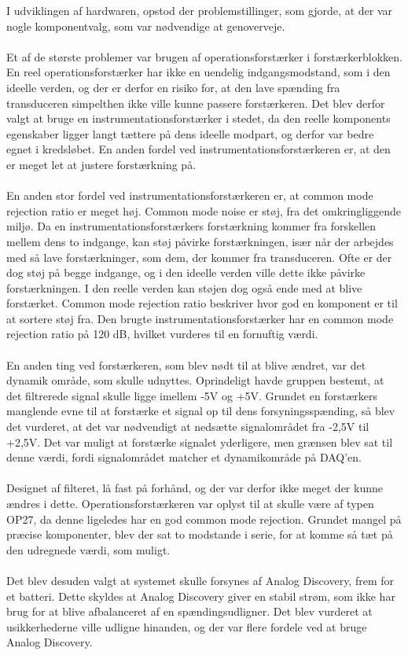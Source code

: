 I udviklingen af hardwaren, opstod der problemstillinger, som  gjorde, at der var nogle komponentvalg, som var nødvendige at genoverveje.\\
\\
Et af de største problemer var brugen af  operationsforstærker i forstærkerblokken. En reel operationsforstærker har ikke en uendelig indgangsmodstand, som i den ideelle verden, og der er derfor en risiko for, at den lave spænding fra transduceren simpelthen ikke ville kunne passere forstærkeren. Det blev derfor valgt at bruge en instrumentationsforstærker i stedet, da den reelle komponents egenskaber ligger langt tættere på dens ideelle modpart, og derfor var bedre egnet i kredsløbet. En anden fordel ved instrumentationsforstærkeren er, at den er meget let at justere forstærkning på.\\
\\
En anden stor fordel ved instrumentationsforstærkeren er, at common mode rejection ratio er meget høj. Common mode noise er støj, fra det omkringliggende miljø. Da en instrumentationsforstærkers forstærkning kommer fra forskellen mellem dens to indgange, kan støj påvirke forstærkningen, især når der arbejdes med så lave forstærkninger, som dem, der kommer fra transduceren. Ofte er der dog støj på begge indgange, og i den ideelle verden ville dette ikke påvirke forstærkningen. I den reelle verden kan støjen dog også ende med at blive forstærket. Common mode rejection ratio beskriver hvor god en komponent er til at sortere støj fra. Den brugte instrumentationsforstærker har en common mode rejection ratio på 120 dB, hvilket vurderes til en fornuftig værdi. \\
\\
En anden ting ved forstærkeren, som blev nødt til at blive ændret, var det dynamik område, som skulle udnyttes. Oprindeligt havde gruppen bestemt, at det filtrerede signal skulle ligge imellem -5V og +5V. Grundet en forstærkers manglende evne til at forstærke et signal op til dens forsyningsspænding, så blev det vurderet, at det var nødvendigt at nedsætte signalområdet fra -2,5V til +2,5V. Det var muligt at forstærke signalet yderligere, men grænsen blev sat til denne værdi, fordi signalområdet matcher et dynamikområde på DAQ'en.\\ 
\\
Designet af filteret, lå fast på forhånd, og der var derfor ikke meget der kunne ændres i dette. Operationsforstærkeren var oplyst til at skulle være af typen OP27, da denne ligeledes har en god common mode rejection. Grundet mangel på præcise komponenter, blev der sat to modstande i serie, for at komme så tæt på den udregnede værdi, som muligt. \\
\\
Det blev desuden valgt at systemet skulle forsynes af Analog Discovery, frem for et batteri. Dette skyldes at Analog Discovery giver en stabil strøm, som ikke har brug for at blive afbalanceret af en spændingsudligner. Det blev vurderet at usikkerhederne ville udligne hinanden, og der var flere fordele ved at bruge Analog Discovery.\\


